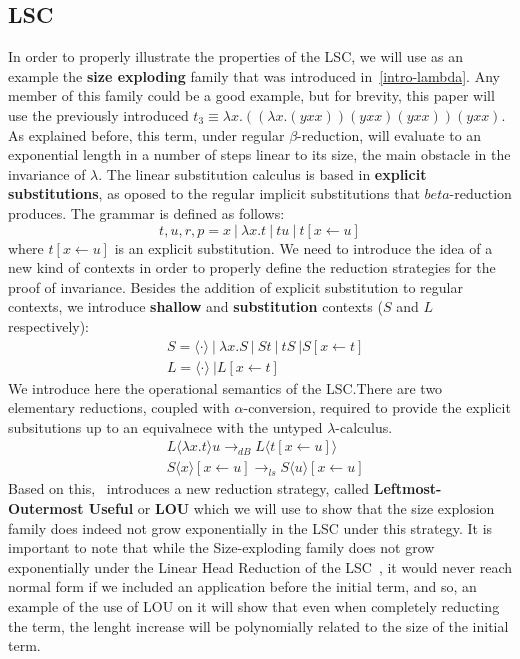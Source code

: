 \documentclass[12pt]{article}
\begin{document}
\subsection{LSC}
In order to properly illustrate the properties of the LSC, we will use as an example the \textbf{size exploding} family that was introduced in~\ref{intro-lambda}. Any member of this family could be a good example, but for brevity, this paper will use the previously introduced $t_{3} \equiv \lambda x.((\lambda x. (yxx))(yxx)(yxx))(yxx)$. As explained before, this term, under regular $\beta$-reduction, will evaluate to an exponential length in a number of steps linear to its size, the main obstacle in the invariance of $\lambda$.
The linear substitution calculus is based in \textbf{explicit substitutions}, as oposed to the regular implicit substitutions that $beta$-reduction produces. The grammar is defined as follows:
\begin{equation}
  t, u, r, p = x \ | \ \lambda x.t \ | \ tu \ | \ t[x \leftarrow u]
\end{equation}
where $t[x \leftarrow u]$ is an explicit substitution.
We need to introduce the idea of a new kind of contexts in order to properly define the reduction strategies for the proof of invariance. Besides the addition of explicit substitution to regular contexts, we introduce \textbf{shallow} and \textbf{substitution} contexts ($S$ and $L$ respectively):
\begin{equation}
  \begin{split}
    &S = \langle \cdot \rangle \ | \ \lambda x.S \ | \ St \ | \ tS \ | S[x \leftarrow t] \\
    &L = \langle \cdot \rangle \ | L[x \leftarrow t]
  \end{split}
\end{equation}
We introduce here the operational semantics of the LSC.There are two elementary reductions, coupled with $\alpha$-conversion, required to provide the explicit subsitutions up to an equivalnece with the untyped $\lambda$-calculus.
\begin{equation}
  \begin{split}
    &L \langle \lambda x .t \rangle u \rightarrow_{dB} L \langle t [x \leftarrow u] \rangle \\
    &S \langle x \rangle [x \leftarrow u] \rightarrow_{ls} S \langle u \rangle [x \leftarrow u]
  \end{split}
\end{equation}
Based on this,~\cite{beta-invariance} introduces a new reduction strategy, called \textbf{Leftmost-Outermost Useful} or \textbf{LOU} which we will use to show that the size explosion family does indeed not grow exponentially in the LSC under this strategy. It is important to note that while the Size-exploding family does not grow exponentially under the Linear Head Reduction of the LSC~\cite{invariance-of-cost-model}, it would never reach normal form if we included an application before the initial term, and so, an example of the use of LOU on it will show that even when completely reducting the term, the lenght increase will be polynomially related to the size of the initial term.
\end{document}
